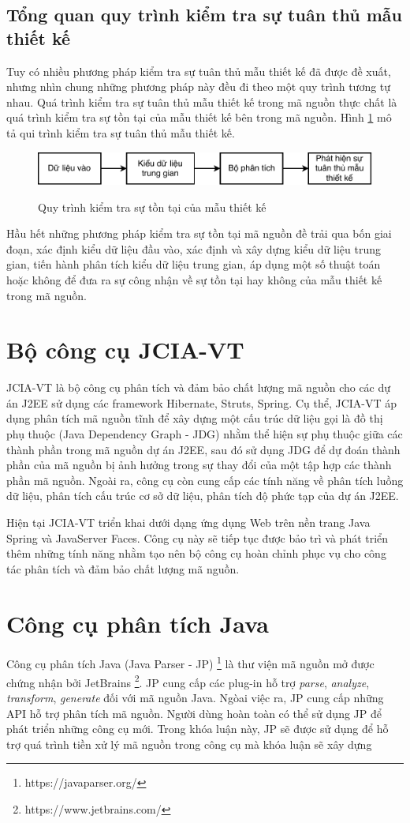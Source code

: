 \documentclass[12pt]{report}
\begin{document}
\subsection{Tổng quan quy trình kiểm tra sự tuân thủ mẫu thiết kế}
Tuy có nhiều phương pháp kiểm tra sự tuân thủ mẫu thiết kế đã được đề xuất, nhưng nhìn chung những phương pháp này đều đi theo một quy trình tương tự nhau. Quá trình kiểm tra sự tuân thủ mẫu thiết kế trong mã nguồn thực chất là quá trình kiểm tra sự tồn tại của mẫu thiết kế bên trong mã nguồn.
Hình \ref{fig:ddp_process} mô tả qui trình kiểm tra sự tuân thủ mẫu thiết kế.
\begin{figure}[h]
	\centering
	\includegraphics[scale=1]{images/ddp}
	\label{fig:ddp_process}
	\caption{Quy trình kiểm tra sự tồn tại của mẫu thiết kế}
\end{figure}
Hầu hết những phương pháp kiểm tra sự tồn tại mã nguồn đề trải qua bốn giai đoạn, xác định kiểu dữ liệu đầu vào, xác định và xây dựng kiểu dữ liệu trung gian, tiến hành phân tích kiểu dữ liệu trung gian, áp dụng một số thuật toán hoặc không để đưa ra sự công nhận về sự tồn tại hay không của mẫu thiết kế trong mã nguồn.

\section{Bộ công cụ JCIA-VT}
JCIA-VT \cite{jcia-vt} là bộ công cụ phân tích và đảm bảo chất lượng mã nguồn cho các dự án J2EE sử dụng các framework Hibernate, Struts, Spring. Cụ thể, JCIA-VT áp dụng phân tích mã nguồn tĩnh để xây dựng một cấu trúc dữ liệu gọi là đồ thị phụ thuộc (Java Dependency Graph - JDG) nhằm thể hiện sự phụ thuộc giữa các thành phần trong mã nguồn dự án J2EE, sau đó sử dụng JDG để dự đoán thành phần của mã nguồn bị ảnh hưởng trong sự thay đổi của một tập hợp các thành phần mã nguồn. Ngoài ra, công cụ còn cung cấp các tính năng về phân tích luồng dữ liệu, phân tích cấu trúc cơ sở dữ liệu, phân tích độ phức tạp của dự án J2EE.

\noindent Hiện tại JCIA-VT triển khai dưới dạng ứng dụng Web trên nền trang Java Spring và JavaServer Faces. Công cụ này sẽ tiếp tục được bảo trì và phát triển thêm những tính năng nhằm tạo nên bộ công cụ hoàn chỉnh phục vụ cho công tác phân tích và đảm bảo chất lượng mã nguồn.
\section{Công cụ phân tích Java}
Công cụ phân tích Java (Java Parser - JP) \footnote{https://javaparser.org/} là thư viện mã nguồn mở được chứng nhận bởi JetBrains \footnote{https://www.jetbrains.com/}. JP cung cấp các plug-in hỗ trợ \textit{parse}, \textit{analyze}, \textit{transform}, \textit{generate } đối với mã nguồn Java. Ngòai việc ra, JP cung cấp những API hỗ trợ phân tích mã nguồn. Người dùng hoàn toàn có thể sử dụng JP để phát triển những công cụ mới. Trong khóa luận này, JP sẽ được sử dụng để hỗ trợ quá trình tiền xử lý mã nguồn trong công cụ mà khóa luận sẽ xây dựng
\end{document}
